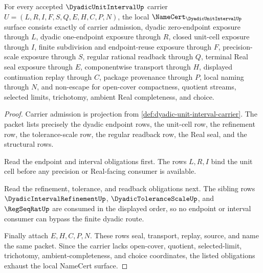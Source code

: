 \begin{theorem}
\label{thm:dyadic-unit-interval-namecert-obligations}
For every accepted $\DyadicUnitIntervalUp$ carrier $U=(L,R,I,F,S,Q,E,H,C,P,N)$, the local $\NameCert_{\DyadicUnitIntervalUp}$ surface consists exactly of carrier admission, dyadic zero-endpoint exposure through $L$, dyadic one-endpoint exposure through $R$, closed unit-cell exposure through $I$, finite subdivision and endpoint-reuse exposure through $F$, precision-scale exposure through $S$, regular rational readback through $Q$, terminal Real seal exposure through $E$, componentwise transport through $H$, displayed continuation replay through $C$, package provenance through $P$, local naming through $N$, and non-escape for open-cover compactness, quotient streams, selected limits, trichotomy, ambient Real completeness, and choice.
\end{theorem}
\begin{proof}
Carrier admission is projection from \autoref{def:dyadic-unit-interval-carrier}. The packet lists precisely the dyadic endpoint rows, the unit-cell row, the refinement row, the tolerance-scale row, the regular readback row, the Real seal, and the structural rows.

Read the endpoint and interval obligations first. The rows $L,R,I$ bind the unit cell before any precision or Real-facing consumer is available.

Read the refinement, tolerance, and readback obligations next. The sibling rows $\DyadicIntervalRefinementUp$, $\DyadicToleranceScaleUp$, and $\RegSeqRatUp$ are consumed in the displayed order, so no endpoint or interval consumer can bypass the finite dyadic route.

Finally attach $E,H,C,P,N$. These rows seal, transport, replay, source, and name the same packet. Since the carrier lacks open-cover, quotient, selected-limit, trichotomy, ambient-completeness, and choice coordinates, the listed obligations exhaust the local NameCert surface.
\end{proof}

